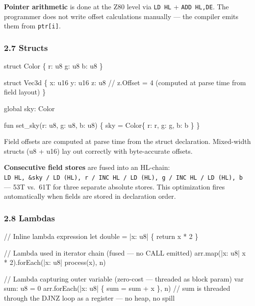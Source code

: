 \documentclass[
  11pt,
]{article}
\newenvironment{Shaded}{}{}
\newcommand{\NormalTok}[1]{#1}
\begin{document}
\textbf{Pointer arithmetic} is done at the Z80 level via \texttt{LD\ HL}
+ \texttt{ADD\ HL,DE}. The programmer does not write offset calculations
manually --- the compiler emits them from \texttt{ptr{[}i{]}}.

\subsubsection{2.7 Structs}\label{structs}

\begin{Shaded}
\begin{Highlighting}[]
\NormalTok{struct Color \{}
\NormalTok{    r: u8}
\NormalTok{    g: u8}
\NormalTok{    b: u8}
\NormalTok{\}}

\NormalTok{struct Vec3d \{}
\NormalTok{    x: u16}
\NormalTok{    y: u16}
\NormalTok{    z: u8       // z.Offset = 4 (computed at parse time from field layout)}
\NormalTok{\}}

\NormalTok{global sky: Color}

\NormalTok{fun set\_sky(r: u8, g: u8, b: u8) \{}
\NormalTok{    sky = Color\{ r: r, g: g, b: b \}}
\NormalTok{\}}
\end{Highlighting}
\end{Shaded}

Field offsets are computed at parse time from the struct declaration.
Mixed-width structs (u8 + u16) lay out correctly with byte-accurate
offsets.

\textbf{Consecutive field stores} are fused into an HL-chain:
\texttt{LD\ HL,\ \&sky\ /\ LD\ (HL),\ r\ /\ INC\ HL\ /\ LD\ (HL),\ g\ /\ INC\ HL\ /\ LD\ (HL),\ b}
--- 53T vs.~61T for three separate absolute stores. This optimization
fires automatically when fields are stored in declaration order.

\subsubsection{2.8 Lambdas}\label{lambdas}

\begin{Shaded}
\begin{Highlighting}[]
\NormalTok{// Inline lambda expression}
\NormalTok{let double = |x: u8| \{ return x * 2 \}}

\NormalTok{// Lambda used in iterator chain (fused — no CALL emitted)}
\NormalTok{arr.map(|x: u8| x * 2).forEach(|x: u8| process(x), n)}

\NormalTok{// Lambda capturing outer variable (zero{-}cost — threaded as block param)}
\NormalTok{var sum: u8 = 0}
\NormalTok{arr.forEach(|x: u8| \{ sum = sum + x \}, n)}
\NormalTok{// sum is threaded through the DJNZ loop as a register — no heap, no spill}
\end{Highlighting}
\end{Shaded}
\end{document}
